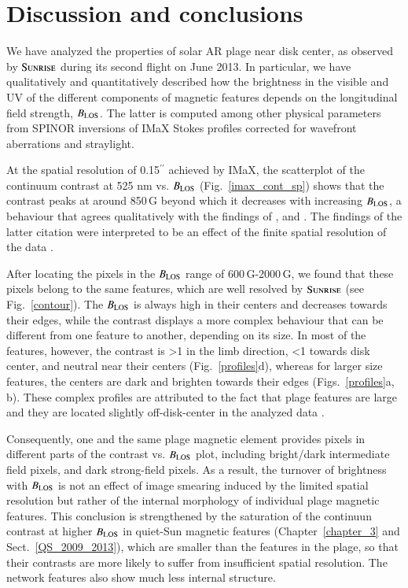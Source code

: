\documentclass[goettingen, gauss, print]{thesis}
\begin{document}
\section{Discussion and conclusions}
\label{conclusion}
We have analyzed the properties of solar AR plage near disk center, as observed by $\textsc{Sunrise}$ during its second flight on June 2013. In particular, we have qualitatively and quantitatively described how the brightness in the visible and UV of the different components of magnetic features depends on the longitudinal field strength, $B_{\rm LOS}$. The latter is computed among other physical parameters from SPINOR inversions of IMaX Stokes profiles corrected for wavefront aberrations and straylight.

At the spatial resolution of 0.15$^{\prime\prime}$ achieved by IMaX, the scatterplot of the continuum contrast at 525 nm vs. $B_{\rm LOS}$ (Fig.~\ref{imax_cont_sp}) shows that the contrast peaks at around 850\,G beyond which it decreases with increasing $B_{\rm LOS}$, a behaviour that agrees qualitatively with the findings of \cite{berger_contrast_2007}, \cite{narayan_small-scale_2010} and \cite{kobel_continuum_2011}. The findings of the latter citation were interpreted to be an effect of the finite spatial resolution of the data \citep{danilovic_relation_2013}.

After locating the pixels in the $B_{\rm LOS}$ range of 600\,G-2000\,G, we found that these pixels belong to the same features, which are well resolved by $\textsc{Sunrise}$ (see Fig.~\ref{contour}). The $B_{\rm LOS}$ is always high in their centers and decreases towards their edges, while the contrast displays a more complex behaviour that can be different from one feature to another, depending on its size. In most of the features, however, the contrast is >1 in the limb direction, <1 towards disk center, and neutral near their centers (Fig.~\ref{profiles}d), whereas for larger size features, the centers are dark and brighten towards their edges (Figs.~\ref{profiles}a, b). These complex profiles are attributed to the fact that plage features are large and they are located slightly off-disk-center in the analyzed data \citep{steiner_recent_2005}.

Consequently, one and the same plage magnetic element provides pixels in different parts of the contrast vs. $B_{\rm LOS}$ plot, including bright/dark intermediate field pixels, and dark strong-field pixels. As a result, the turnover of brightness with $B_{\rm LOS}$ is not an effect of image smearing induced by the limited spatial resolution but rather of the internal morphology of individual plage magnetic features. This conclusion is strengthened by the saturation of the continuun contrast at higher $B_{\rm LOS}$ in quiet-Sun magnetic features (Chapter~\ref{chapter_3} and Sect.~\ref{QS_2009_2013}), which are smaller than the features in the plage, so that their contrasts are more likely to suffer from insufficient spatial resolution. The network features also show much less internal structure.
\end{document}
